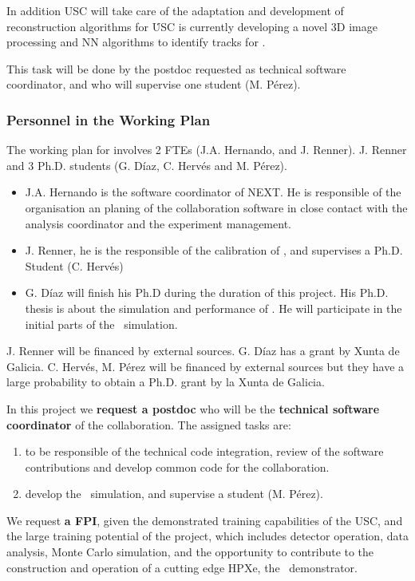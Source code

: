 In addition USC will take care of the adaptation and development of reconstruction algorithms for \HDEMO\. USC is currently developing a novel 3D image processing and NN algorithms to identify tracks for \Next.

This task will be done by the postdoc requested as technical software coordinator, and who will supervise one student (M. Pérez).



\subsubsection*{Personnel in the Working Plan}

The working plan for \sUSC involves 2 FTEs (J.A. Hernando, and J. Renner). J. Renner and 3 Ph.D. students (G. Díaz, C. Hervés and M. Pérez).

\begin{itemize}[noitemsep,topsep=0pt,parsep=0pt,partopsep=0pt]
\item J.A. Hernando is the software coordinator of NEXT. He is responsible of the organisation an planing of the collaboration software in close contact with the analysis coordinator and the experiment management.

\item J. Renner, he is the responsible of the calibration of \New, and supervises a Ph.D. Student (C. Hervés)

\item G. Díaz will finish his Ph.D during the duration of this project. His Ph.D. thesis is about the simulation and performance of \Next. He will participate in the initial parts of the \HDEMO\ simulation.


\end{itemize}

J. Renner will be financed by external sources. G. Díaz has a grant by Xunta de Galicia. C. Hervés, M. Pérez will be financed by external sources but they have a large probability to obtain a Ph.D. grant by la Xunta de Galicia.

In this project we {\bf request a postdoc} who will be the {\bf technical software coordinator} of the collaboration. The assigned tasks are:

\begin{enumerate}
    \item to be responsible of the technical code integration, review of the software contributions and develop common code for the collaboration. 
    
    \item  develop the \HDemo\ simulation, and supervise a student (M. Pérez). 
\end{enumerate}

We request {\bf a FPI}, given the demonstrated training capabilities of the USC, and the large training potential of the project, which includes detector operation, data analysis, Monte Carlo simulation, and the opportunity to contribute to the construction and operation of a cutting edge HPXe, the \HDEMO\ demonstrator.